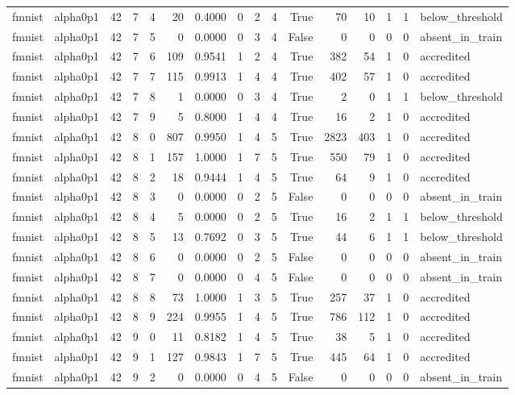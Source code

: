 \begin{tabular}{llrrrrrrrrrrrrrl}
fmnist & alpha0p1 & 42 & 7 & 4 & 20 & 0.4000 & 0 & 2 & 4 & True & 70 & 10 & 1 & 1 & below\_threshold \\
fmnist & alpha0p1 & 42 & 7 & 5 & 0 & 0.0000 & 0 & 3 & 4 & False & 0 & 0 & 0 & 0 & absent\_in\_train \\
fmnist & alpha0p1 & 42 & 7 & 6 & 109 & 0.9541 & 1 & 2 & 4 & True & 382 & 54 & 1 & 0 & accredited \\
fmnist & alpha0p1 & 42 & 7 & 7 & 115 & 0.9913 & 1 & 4 & 4 & True & 402 & 57 & 1 & 0 & accredited \\
fmnist & alpha0p1 & 42 & 7 & 8 & 1 & 0.0000 & 0 & 3 & 4 & True & 2 & 0 & 1 & 1 & below\_threshold \\
fmnist & alpha0p1 & 42 & 7 & 9 & 5 & 0.8000 & 1 & 4 & 4 & True & 16 & 2 & 1 & 0 & accredited \\
fmnist & alpha0p1 & 42 & 8 & 0 & 807 & 0.9950 & 1 & 4 & 5 & True & 2823 & 403 & 1 & 0 & accredited \\
fmnist & alpha0p1 & 42 & 8 & 1 & 157 & 1.0000 & 1 & 7 & 5 & True & 550 & 79 & 1 & 0 & accredited \\
fmnist & alpha0p1 & 42 & 8 & 2 & 18 & 0.9444 & 1 & 4 & 5 & True & 64 & 9 & 1 & 0 & accredited \\
fmnist & alpha0p1 & 42 & 8 & 3 & 0 & 0.0000 & 0 & 2 & 5 & False & 0 & 0 & 0 & 0 & absent\_in\_train \\
fmnist & alpha0p1 & 42 & 8 & 4 & 5 & 0.0000 & 0 & 2 & 5 & True & 16 & 2 & 1 & 1 & below\_threshold \\
fmnist & alpha0p1 & 42 & 8 & 5 & 13 & 0.7692 & 0 & 3 & 5 & True & 44 & 6 & 1 & 1 & below\_threshold \\
fmnist & alpha0p1 & 42 & 8 & 6 & 0 & 0.0000 & 0 & 2 & 5 & False & 0 & 0 & 0 & 0 & absent\_in\_train \\
fmnist & alpha0p1 & 42 & 8 & 7 & 0 & 0.0000 & 0 & 4 & 5 & False & 0 & 0 & 0 & 0 & absent\_in\_train \\
fmnist & alpha0p1 & 42 & 8 & 8 & 73 & 1.0000 & 1 & 3 & 5 & True & 257 & 37 & 1 & 0 & accredited \\
fmnist & alpha0p1 & 42 & 8 & 9 & 224 & 0.9955 & 1 & 4 & 5 & True & 786 & 112 & 1 & 0 & accredited \\
fmnist & alpha0p1 & 42 & 9 & 0 & 11 & 0.8182 & 1 & 4 & 5 & True & 38 & 5 & 1 & 0 & accredited \\
fmnist & alpha0p1 & 42 & 9 & 1 & 127 & 0.9843 & 1 & 7 & 5 & True & 445 & 64 & 1 & 0 & accredited \\
fmnist & alpha0p1 & 42 & 9 & 2 & 0 & 0.0000 & 0 & 4 & 5 & False & 0 & 0 & 0 & 0 & absent\_in\_train \\

\end{tabular}
